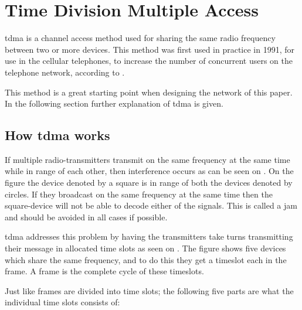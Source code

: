 \chapter{Time Division Multiple Access}\label{TDMA}

\gls{tdma} is a channel access method used for sharing the same radio frequency between two or more devices.
This method was first used in practice in 1991, for use in the cellular telephones, to increase the number of concurrent users on the telephone network, according to \citet{networkencyclopedia2013time}.

This method is a great starting point when designing the network of this paper.
In the following section further explanation of \gls{tdma} is given.

\section{How \acrshort{tdma} works}

If multiple radio-transmitters transmit on the same frequency at the same time while in range of each other, then interference occurs as can be seen on . 
On the figure the device denoted by a square is in range of both the devices denoted by circles. 
If they broadcast on the same frequency at the same time then the square-device will not be able to decode either of the signals\cite{networkencyclopedia2013time, networkencyclopedia2013advanced}.
This is called a jam and should be avoided in all cases if possible.


\gls{tdma} addresses this problem by having the transmitters take turns transmitting their message in allocated time slots as seen on .
The figure shows five devices which share the same frequency, and to do this they get a timeslot each in the frame.
A frame is the complete cycle of these timeslots.


\noindent
Just like frames are divided into time slots; the following five parts are what the individual time slots consists of:

